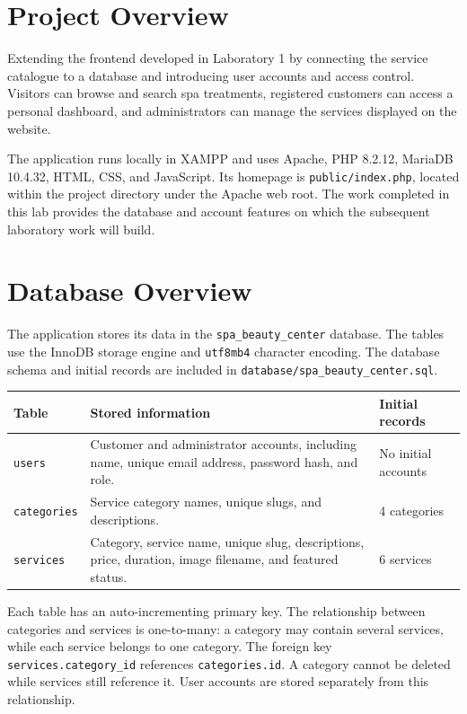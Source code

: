 \documentclass[11pt,a4paper]{article}
\newcommand{\code}[1]{{\small\nolinkurl{#1}}}
\begin{document}
\clearpage
{}
\hypersetup{pageanchor=true}
\tableofcontents
\clearpage
{}

\section{Project Overview}

 Extending the frontend developed
in Laboratory 1 by connecting the service catalogue to a database and introducing
user accounts and access control. Visitors can browse and search spa treatments,
registered customers can access a personal dashboard, and administrators can
manage the services displayed on the website.

The application runs locally in XAMPP and uses Apache, PHP 8.2.12, MariaDB
10.4.32, HTML, CSS, and JavaScript. Its homepage is
\code{public/index.php}, located within the project directory under the Apache
web root. The work completed in this lab provides the database and account
features on which the subsequent laboratory work will build.

\section{Database Overview}

The application stores its data in the \code{spa_beauty_center} database.
The tables use the InnoDB storage engine and \code{utf8mb4} character encoding.
The database schema and initial records are included in
\code{database/spa_beauty_center.sql}.

\begin{tabularx}{\linewidth}{@{}P{23mm}YP{30mm}@{}}
\toprule
\textbf{Table} & \textbf{Stored information} & \textbf{Initial records} \\
\midrule
\code{users} & Customer and administrator accounts, including name,
unique email address, password hash, and role. & No initial accounts \\
\code{categories} & Service category names, unique slugs, and descriptions.
& 4 categories \\
\code{services} & Category, service name, unique slug, descriptions, price,
duration, image filename, and featured status. & 6 services \\
\bottomrule
\end{tabularx}

Each table has an auto-incrementing primary key. The relationship between
categories and services is one-to-many: a category may contain several services,
while each service belongs to one category. The foreign key
\code{services.category_id} references \code{categories.id}. A category cannot
be deleted while services still reference it. User accounts are stored separately
from this relationship.
\end{document}
